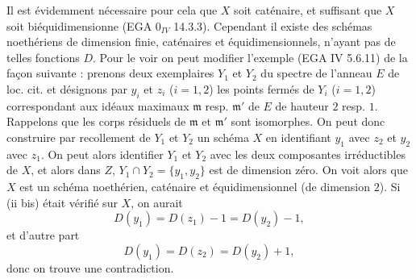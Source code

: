 Il est
évidemment nécessaire pour cela que $X$ soit caténaire, et suffisant que $X$ soit biéquidimensionne (EGA $0_{IV}$ 14.3.3). Cependant il existe des schémas noethériens de dimension finie, caténaires et équidimensionnels, n'ayant pas de telles fonctions $D$. Pour le voir on peut modifier l'exemple (EGA IV 5.6.11) de la façon suivante : prenons deux exemplaires $Y_1$ et $Y_2$ du spectre de l'anneau $E$ de loc. cit. et désignons par $y_i$ et $z_i$ ($i=1,2$) les points fermés de $Y_i$ ($i=1,2$) correspondant aux idéaux maximaux $\mathfrak m$ resp. $\mathfrak m'$ de $E$ de hauteur $2$ resp. $1$. Rappelons que les corps résiduels de $\mathfrak m$ et $\mathfrak m'$ sont isomorphes. On peut donc construire par recollement de $Y_1$ et $Y_2$ un schéma $X$ en identifiant $y_1$ avec $z_2$ et $y_2$ avec $z_1$. On peut alors identifier $Y_1$ et $Y_2$ avec les deux composantes irréductibles de $X$, et alors dans $Z$, $Y_1\cap Y_2=\{y_1,y_2\}$ est de dimension zéro. On voit alors que $X$ est un schéma noethérien, caténaire et équidimensionnel (de dimension $2$). Si (ii bis) était vérifié sur $X$, on aurait
\[
D(y_1)=D(z_1)-1=D(y_2)-1,
\]
et d'autre part
\[
D(y_1)=D(z_2)=D(y_2)+1,
\]
donc on trouve une contradiction.

